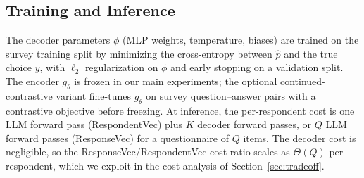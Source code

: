 \subsection{Training and Inference}
\label{sec:training}

The decoder parameters $\phi$ (MLP weights, temperature, biases) are trained on the survey training split by minimizing the cross-entropy between $\hat{p}$ and the true choice $y$, with $\ell_2$ regularization on $\phi$ and early stopping on a validation split. The encoder $g_\theta$ is frozen in our main experiments; the optional continued-contrastive variant fine-tunes $g_\theta$ on survey question--answer pairs with a contrastive objective before freezing. At inference, the per-respondent cost is one LLM forward pass (RespondentVec) plus $K$ decoder forward passes, or $Q$ LLM forward passes (ResponseVec) for a questionnaire of $Q$ items. The decoder cost is negligible, so the ResponseVec/RespondentVec cost ratio scales as $\Theta(Q)$ per respondent, which we exploit in the cost analysis of Section~\ref{sec:tradeoff}.
